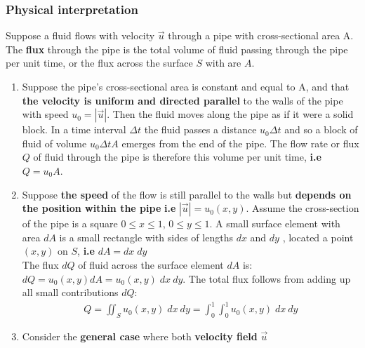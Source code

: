 \documentclass[11pt]{article}
\begin{document}
                \subsubsection{Physical interpretation}
                    Suppose a fluid flows with velocity $\vec{u}$ through a pipe with cross-sectional area A\@.
                    The \textbf{flux} through the pipe is the total volume of fluid passing through the pipe
                    per unit time, or the flux across the surface $S$ with are $A$.
                    \begin{enumerate}
                        \item Suppose the pipe's cross-sectional area is constant and equal to A, and that
                        \textbf{the velocity is uniform and directed parallel} to the walls of the pipe with
                        speed $u_0 = | \vec{u} |$.
                        Then the fluid moves along the pipe as if it were a solid block.
                        In a time interval $\Delta t$ the fluid passes a distance $u_0 \Delta t$ and so a block of fluid
                        of volume $u_0 \Delta t A$ emerges from the end of the pipe.
                        The flow rate or flux $Q$ of fluid through the pipe is therefore this volume per unit time, \textbf{i.e}
                        $Q = u_0 A$.
                        \item Suppose \textbf{the speed} of the flow is still parallel to the walls but
                        \textbf{depends on the position within the pipe} \textbf{i.e} $|\vec{u}| = u_0 (x,y)$.
                        Assume the cross-section of the pipe is a square $ 0 \leq x \leq 1$, $ 0 \leq y \leq 1$.
                        A small surface element with area $dA$ is a small rectangle with sides of lengths $dx$ and $dy$
                        , located a point $(x,y)$ on $S$, \textbf{i.e} $dA = dx \; dy$\\
                        The flux $dQ$ of fluid across the surface element $dA$ is: $dQ = u_0(x, y) dA = u_0(x, y) \; dx \: dy$.
                        The total flux follows from adding up all small contributions $dQ$:
                        \begin{align}
                            Q = \iint_S u_0 (x, y) \;dx \: dy = \int_{0}^{1} \int_{0}^{1} u_0 (x, y) \; dx \: dy
                        \end{align}
                        \item Consider the \textbf{general case} where both \textbf{velocity field} $\vec{u}$

\end{enumerate}
\end{document}
